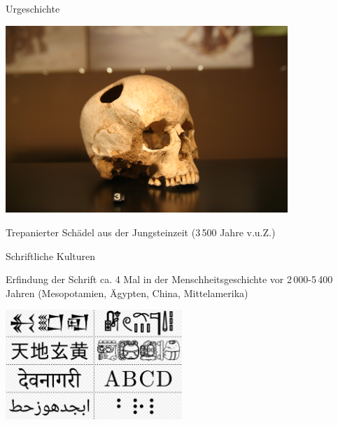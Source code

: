\documentclass{beamer}
\begin{document}
\begin{frame}{Urgeschichte}

\begin{center}
    \includegraphics[width=0.8\textwidth]{Crane-trepanation-img_0507.jpg}
\end{center}

Trepanierter Schädel aus der Jungsteinzeit (3\,500 Jahre v.u.Z.)

\end{frame}

\begin{frame}{Schriftliche Kulturen}

Erfindung der Schrift ca. 4 Mal in der Menschheitsgeschichte vor 2\,000-5\,400 Jahren (Mesopotamien, Ägypten, China, Mittelamerika) \\
\vfill

\centering
\includegraphics[width=0.5\textwidth]{Writing_system_survey.png}

\end{frame}
\end{document}
